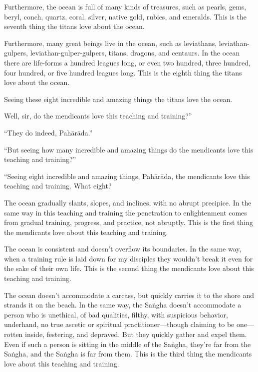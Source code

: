 \documentclass[12pt,openany]{book}%
\begin{document}
Furthermore, the ocean is full of many kinds of treasures, such as pearls, gems, beryl, conch, quartz, coral, silver, native gold, rubies, and emeralds. This is the seventh thing the titans love about the ocean. 

Furthermore, many great beings live in the ocean, such as leviathans, leviathan-gulpers, leviathan-gulper-gulpers, titans, dragons, and centaurs. In the ocean there are life-forms a hundred leagues long, or even two hundred, three hundred, four hundred, or five hundred leagues long. This is the eighth thing the titans love about the ocean. 

Seeing these eight incredible and amazing things the titans love the ocean. 

Well, sir, do the mendicants love this teaching and training?” 

“They do indeed, \textsanskrit{Pahārāda}.” 

“But seeing how many incredible and amazing things do the mendicants love this teaching and training?” 

“Seeing eight incredible and amazing things, \textsanskrit{Pahārāda}, the mendicants love this teaching and training. What eight? 

The ocean gradually slants, slopes, and inclines, with no abrupt precipice. In the same way in this teaching and training the penetration to enlightenment comes from gradual training, progress, and practice, not abruptly. This is the first thing the mendicants love about this teaching and training. 

The ocean is consistent and doesn’t overflow its boundaries. In the same way, when a training rule is laid down for my disciples they wouldn’t break it even for the sake of their own life. This is the second thing the mendicants love about this teaching and training. 

The ocean doesn’t accommodate a carcass, but quickly carries it to the shore and strands it on the beach. In the same way, the \textsanskrit{Saṅgha} doesn’t accommodate a person who is unethical, of bad qualities, filthy, with suspicious behavior, underhand, no true ascetic or spiritual practitioner—though claiming to be one—rotten inside, festering, and depraved. But they quickly gather and expel them. Even if such a person is sitting in the middle of the \textsanskrit{Saṅgha}, they’re far from the \textsanskrit{Saṅgha}, and the \textsanskrit{Saṅgha} is far from them. This is the third thing the mendicants love about this teaching and training. 
\end{document}
